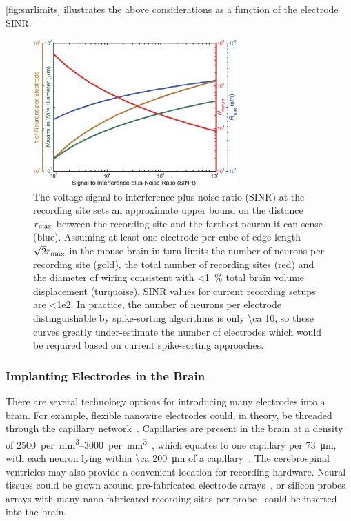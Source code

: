 \autoref{fig:snrlimits} illustrates the above considerations as a function of the electrode SINR.

\begin{figure}[htbp]
\caption{
The voltage signal to interference-plus-noise ratio (SINR) at the recording site sets an approximate upper bound on the distance $r_{\text{\scriptsize max}}$ between the recording site and the farthest neuron it can sense (blue).
Assuming at least one electrode per cube of edge length $\sqrt{2}r_{\text{\scriptsize max}}$ in the mouse brain in turn limits the number of neurons per recording site (gold), the total number of recording sites (red) and the diameter of wiring consistent with \SI{<1}{\percent} total brain volume displacement (turquoise).
SINR values for current recording setups are \num{<1e2}.
In practice, the number of neurons per electrode distinguishable by spike-sorting algorithms is only \num{\ca 10}, so these curves greatly under-estimate the number of electrodes which would be required based on current spike-sorting approaches.
}
\label{fig:snrlimits}
\centering
\includegraphics[width=0.7\textwidth]{figs/Fig3.eps}
\end{figure}

\subsubsection{Implanting Electrodes in the Brain}

There are several technology options for introducing many electrodes into a brain.
For example, flexible nanowire electrodes could, in theory, be threaded through the capillary network~\cite{llinas05}.
Capillaries are present in the brain at a density of \SIrange{2500}{3000}{per \milli\meter\cubed}~\cite{schmidt89}, which equates to one capillary per \SI{73}{\micro\meter}, with each neuron lying within \SI{\ca 200}{\micro\meter} of a capillary~\cite{loffredo08}. 
The cerebrospinal ventricles may also provide a convenient location for recording hardware.
Neural tissues could be grown around pre-fabricated electrode arrays~\cite{jadhav12}, or silicon probes arrays with many nano-fabricated recording sites per probe~\cite{du11} could be inserted into the brain.

